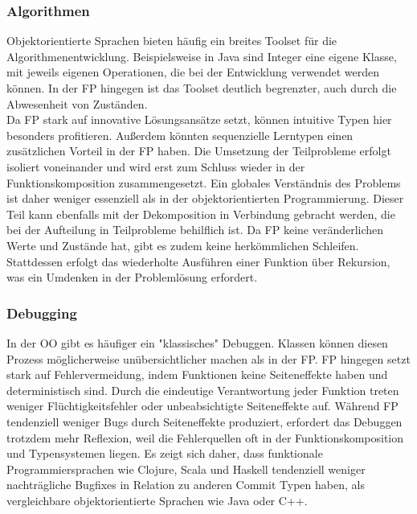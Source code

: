 \subsubsection{Algorithmen}
Objektorientierte Sprachen bieten häufig ein breites Toolset für die Algorithmenentwicklung. Beispielsweise in Java sind Integer eine eigene Klasse, mit jeweils eigenen Operationen, die bei der Entwicklung verwendet werden können. In der FP hingegen ist das Toolset deutlich begrenzter, auch durch die Abwesenheit von Zuständen.
\\
Da FP stark auf innovative Lösungsansätze setzt, können intuitive Typen hier besonders profitieren.
Außerdem könnten sequenzielle Lerntypen einen zusätzlichen Vorteil in der FP haben. Die Umsetzung der Teilprobleme erfolgt isoliert voneinander und wird erst zum Schluss wieder in der Funktionskomposition zusammengesetzt. Ein globales Verständnis des Problems ist daher weniger essenziell als in der objektorientierten Programmierung. Dieser Teil kann ebenfalls mit der Dekomposition in Verbindung gebracht werden, die bei der Aufteilung in Teilprobleme behilflich ist.
Da FP keine veränderlichen Werte und Zustände hat, gibt es zudem keine herkömmlichen Schleifen. Stattdessen erfolgt das wiederholte Ausführen einer Funktion über Rekursion, was ein Umdenken in der Problemlösung erfordert.

\subsubsection{Debugging}
In der OO gibt es häufiger ein "klassisches" Debuggen. Klassen können diesen Prozess möglicherweise unübersichtlicher machen als in der FP. FP hingegen setzt stark auf Fehlervermeidung, indem Funktionen keine Seiteneffekte haben und deterministisch sind. Durch die eindeutige Verantwortung jeder Funktion treten weniger Flüchtigkeitsfehler oder unbeabsichtigte Seiteneffekte auf.
Während FP tendenziell weniger Bugs durch Seiteneffekte produziert, erfordert das Debuggen trotzdem mehr Reflexion, weil die Fehlerquellen oft in der Funktionskomposition und Typensystemen liegen.
Es zeigt sich daher, dass funktionale Programmiersprachen wie Clojure, Scala und Haskell tendenziell weniger nachträgliche Bugfixes in Relation zu anderen Commit Typen haben, als vergleichbare objektorientierte Sprachen wie Java oder C++.

